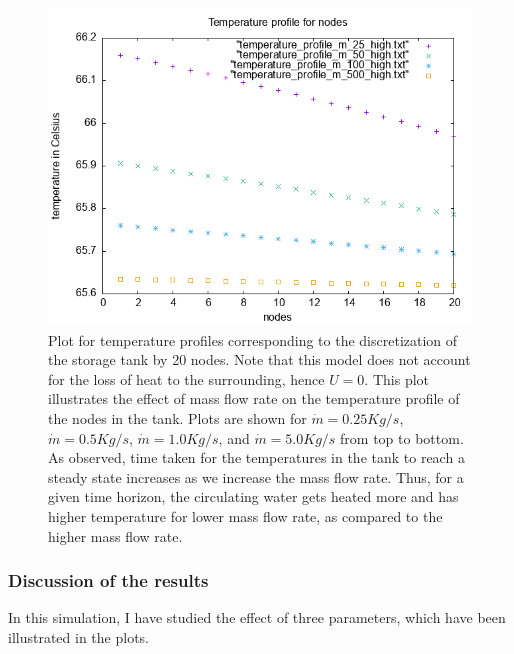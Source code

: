 \documentclass{article}
\begin{document}
\begin{figure}[ht]
\centering
\includegraphics{figures/temperature_profile_m_dot.png}
\caption{Plot for temperature profiles corresponding to the discretization of the storage tank by 20 nodes. Note that this model does not account for the loss of heat to the surrounding, hence $U = 0$. This plot illustrates the effect of mass flow rate on the temperature profile of the nodes in the tank.  Plots are shown for $\dot{m} = 0.25 Kg/s$, $\dot{m} = 0.5 Kg/s$, $\dot{m} = 1.0 Kg/s$, and $\dot{m} = 5.0 Kg/s$ from top to bottom. As observed, time taken for the temperatures in the tank to reach a steady state increases as we increase the mass flow rate.  Thus, for a given time horizon, the circulating water gets heated more and has higher temperature for lower mass flow rate, as compared to the higher mass flow rate. }
\end{figure}

\newpage
\subsubsection*{Discussion of the results}
In this simulation, I have studied the effect of three parameters, which have been illustrated in the plots.
\end{document}
